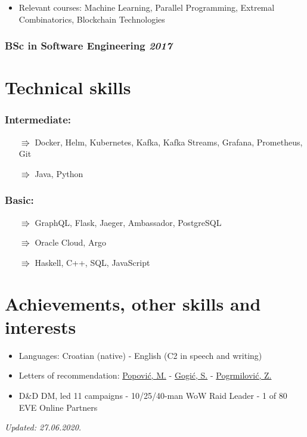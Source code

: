 \documentclass[a4paper]{article}
\newcommand{\bolditalicpair}
[2]
{\textbf{#1} \texorpdfstring{\hfill}{} \textit{#2}}
\begin{document}
\begin{itemize}
  \item Relevant courses: Machine Learning, Parallel Programming, Extremal Combinatorics, Blockchain Technologies %
\end{itemize}

\subsubsection{\bolditalicpair{BSc in Software Engineering}{2017}}



\section{Technical skills}
\subsubsection{\bolditalicpair{Intermediate:}{}}

\begin{itemize}
  \item[$\Rrightarrow$] Docker, Helm, Kubernetes, Kafka, Kafka Streams, Grafana, Prometheus, Git
  \item[$\Rrightarrow$] Java, Python
\end{itemize}

\subsubsection{\bolditalicpair{Basic:}{}}

\begin{itemize}
  \item[$\Rrightarrow$] GraphQL, Flask, Jaeger, Ambassador, PostgreSQL
  \item[$\Rrightarrow$] Oracle Cloud, Argo
  \item[$\Rrightarrow$] Haskell, C++, SQL, JavaScript
\end{itemize}



\section{Achievements, other skills and interests}

\begin{itemize}
  \item Languages: Croatian (native) - English (C2 in speech and writing)
  \item Letters of recommendation: \href{https://github.com/MislavJaksic/CV/blob/master/LoR/AISoft_Popovic.pdf}{Popović, M.} - \href{https://github.com/MislavJaksic/CV/blob/master/LoR/Atos_Gogic.pdf}{Gogić, S.} - \href{https://github.com/MislavJaksic/CV/blob/master/LoR/Atos_Pogrmilovic.pdf}{Pogrmilović, Z.}
  \item D\&D DM, led 11 campaigns - 10/25/40-man WoW Raid Leader - 1 of 80 EVE Online Partners
\end{itemize}

\bolditalicpair{}{Updated: 27.06.2020.}
\end{document}
